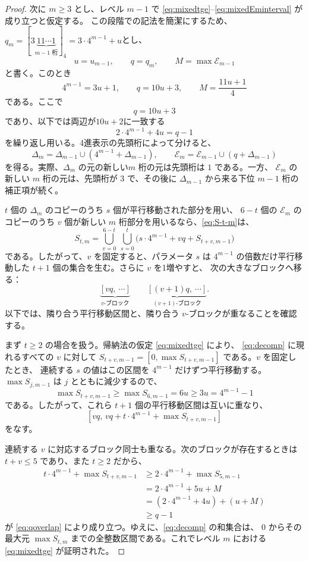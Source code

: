 \documentclass[12pt]{ltjsarticle}
\theoremstyle{plain}
\begin{document}
\begin{proof}
次に $m\geq3$ とし、レベル $m-1$ で
\eqref{eq:mixedtge}--\eqref{eq:mixedEminterval} が成り立つと仮定する。
この段階での記法を簡潔にするため、$ q_m=[3\underbrace{11\cdots1}_{m-1\text{ 桁}}]_4
      =3\cdot4^{m-1}+u$とし、
\[
 u=u_{m-1},\qquad q=q_m,
 \qquad M=\max\mathcal E_{m-1}
\]
と書く。このとき
\[
 4^{m-1}=3u+1,\qquad q=10u+3,
 \qquad M=\frac{11u+1}{4}
\]
である。ここで
\begin{equation}\label{eq:qmdef}
 q=10u+3
\end{equation}
であり、以下では両辺が$10u+2$に一致する
\begin{equation}\label{eq:qoverlap}
 2\cdot4^{m-1}+4u=q-1
\end{equation}
を繰り返し用いる。4進表示の先頭桁によって分けると、
\[
 \Delta_m=\Delta_{m-1}\cup(4^{m-1}+\Delta_{m-1}),\qquad
 \mathcal E_m=\mathcal E_{m-1}\cup(q+\Delta_{m-1})
\]
を得る。実際、$\Delta_m$ の元の新しい$m$ 桁の元は先頭桁は $1$ である。一方、
$\mathcal E_m$ の新しい $m$ 桁の元は、先頭桁が $3$ で、その後に
$\Delta_{m-1}$ から来る下位 $m-1$ 桁の補正項が続く。

$t$ 個の $\Delta_m$ のコピーのうち $s$ 個が平行移動された部分を用い、
$6-t$ 個の $\mathcal E_m$ のコピーのうち $v$ 個が新しい $m$ 桁部分を用いるなら、\eqref{eq:S-t-m}は、
\begin{equation}\label{eq:decomp}
 S_{t,m}=\bigcup_{v=0}^{6-t}\ \bigcup_{s=0}^{t}
 \bigl(s\cdot4^{m-1}+vq+S_{t+v,m-1}\bigr)
\end{equation}
である。したがって、$v$ を固定すると、パラメータ $s$ は
$4^{m-1}$ の倍数だけ平行移動した $t+1$ 個の集合を生む。さらに $v$ を1増やすと、
次の大きなブロックへ移る：
\[
 \underbrace{[vq,\ \cdots]}_{v\text{-ブロック}}
 \qquad
 \underbrace{[(v+1)q,\ \cdots]}_{(v+1)\text{-ブロック}}.
\]
以下では、隣り合う平行移動区間と、隣り合う $v$-ブロックが重なることを確認する。

まず $t\geq2$ の場合を扱う。帰納法の仮定 \eqref{eq:mixedtge} により、
\eqref{eq:decomp} に現れるすべての $v$ に対して
$S_{t+v,m-1}=[0,\max S_{t+v,m-1}]$ である。$v$ を固定したとき、
連続する $s$ の値はこの区間を $4^{m-1}$ だけずつ平行移動する。
$\max S_{j,m-1}$ は $j$ とともに減少するので、
\[
 \max S_{t+v,m-1}\geq\max S_{6,m-1}=6u
     \geq3u=4^{m-1}-1
\]
である。したがって、これら $t+1$ 個の平行移動区間は互いに重なり、
\[
 [vq,\,vq+t\cdot4^{m-1}+\max S_{t+v,m-1}]
\]
をなす。

連続する $v$ に対応するブロック同士も重なる。次のブロックが存在するときは
$t+v\leq5$ であり、また $t\geq2$ だから、
\[
\begin{aligned}
 t\cdot4^{m-1}+\max S_{t+v,m-1}
 &\geq2\cdot4^{m-1}+\max S_{5,m-1}\\
 &=2\cdot4^{m-1}+5u+M\\
 &=(2\cdot4^{m-1}+4u)+(u+M)\\
 &\geq q-1
\end{aligned}
\]
が \eqref{eq:qoverlap} により成り立つ。ゆえに、\eqref{eq:decomp} の和集合は、
$0$ からその最大元 $\max S_{t,m}$ までの全整数区間である。これでレベル $m$ における
\eqref{eq:mixedtge} が証明された。


\end{proof}
\end{document}
